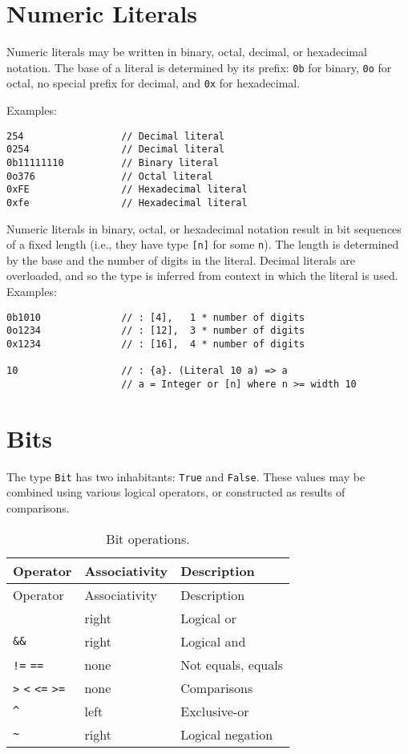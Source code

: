 \section{Numeric Literals}\label{numeric-literals}

Numeric literals may be written in binary, octal, decimal, or
hexadecimal notation. The base of a literal is determined by its prefix:
\texttt{0b} for binary, \texttt{0o} for octal, no special prefix for
decimal, and \texttt{0x} for hexadecimal.

Examples:

\begin{verbatim}
254                 // Decimal literal
0254                // Decimal literal
0b11111110          // Binary literal
0o376               // Octal literal
0xFE                // Hexadecimal literal
0xfe                // Hexadecimal literal
\end{verbatim}

Numeric literals in binary, octal, or hexadecimal notation result in
bit sequences of a fixed length (i.e., they have type \texttt{[n]} for
some \texttt{n}). The length is determined by the base and the number
of digits in the literal. Decimal literals are overloaded, and so the
type is inferred from context in which the literal is used. Examples:

\begin{verbatim}
0b1010              // : [4],   1 * number of digits
0o1234              // : [12],  3 * number of digits
0x1234              // : [16],  4 * number of digits

10                  // : {a}. (Literal 10 a) => a
                    // a = Integer or [n] where n >= width 10
\end{verbatim}

\section{Bits}\label{bits}

The type \texttt{Bit} has two inhabitants: \texttt{True} and
\texttt{False}. These values may be combined using various logical
operators, or constructed as results of comparisons.

\begin{longtable}[c]{@{}lll@{}}
\caption{Bit operations.}\tabularnewline
\toprule
Operator & Associativity & Description\tabularnewline
\midrule
\endfirsthead
\toprule
Operator & Associativity & Description\tabularnewline
\midrule
\endhead
\texttt{\textbar{}\textbar{}} & right & Logical or\tabularnewline
\texttt{\&\&} & right & Logical and\tabularnewline
\texttt{!=} \texttt{==} & none & Not equals, equals\tabularnewline
\texttt{\textgreater{}} \texttt{\textless{}} \texttt{\textless{}=}
\texttt{\textgreater{}=} & none & Comparisons\tabularnewline
\texttt{\^{}} & left & Exclusive-or\tabularnewline
\texttt{\textasciitilde{}} & right & Logical negation\tabularnewline
\bottomrule
\end{longtable}

